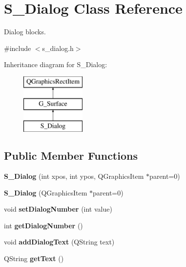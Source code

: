 \hypertarget{class_s___dialog}{}\section{S\+\_\+\+Dialog Class Reference}
\label{class_s___dialog}


Dialog blocks.  




{\ttfamily \#include $<$s\+\_\+dialog.\+h$>$}

Inheritance diagram for S\+\_\+\+Dialog\+:\begin{figure}[H]
\begin{center}
\leavevmode
\includegraphics[height=3.000000cm]{class_s___dialog}
\end{center}
\end{figure}
\subsection*{Public Member Functions}
\begin{DoxyCompactItemize}
\item 
\hypertarget{class_s___dialog_a9b20a59ab0954ef8d9befdfbb556e398}{}{\bfseries S\+\_\+\+Dialog} (int xpos, int ypos, Q\+Graphics\+Item $\ast$parent=0)\label{class_s___dialog_a9b20a59ab0954ef8d9befdfbb556e398}

\item 
\hypertarget{class_s___dialog_a1694750fe7501bc3cd20eb97e1e3384f}{}{\bfseries S\+\_\+\+Dialog} (Q\+Graphics\+Item $\ast$parent=0)\label{class_s___dialog_a1694750fe7501bc3cd20eb97e1e3384f}

\item 
\hypertarget{class_s___dialog_a139b0eb3a98042192ac78df37806f1ad}{}void {\bfseries set\+Dialog\+Number} (int value)\label{class_s___dialog_a139b0eb3a98042192ac78df37806f1ad}

\item 
\hypertarget{class_s___dialog_ad26a628ae1d62d07e1b226126b04814f}{}int {\bfseries get\+Dialog\+Number} ()\label{class_s___dialog_ad26a628ae1d62d07e1b226126b04814f}

\item 
\hypertarget{class_s___dialog_ac156dc3bb16b5c84bce3c710dae215f7}{}void {\bfseries add\+Dialog\+Text} (Q\+String text)\label{class_s___dialog_ac156dc3bb16b5c84bce3c710dae215f7}

\item 
\hypertarget{class_s___dialog_aac6c0556054892ff474f485b962027fd}{}Q\+String {\bfseries get\+Text} ()\label{class_s___dialog_aac6c0556054892ff474f485b962027fd}

\end{DoxyCompactItemize}



